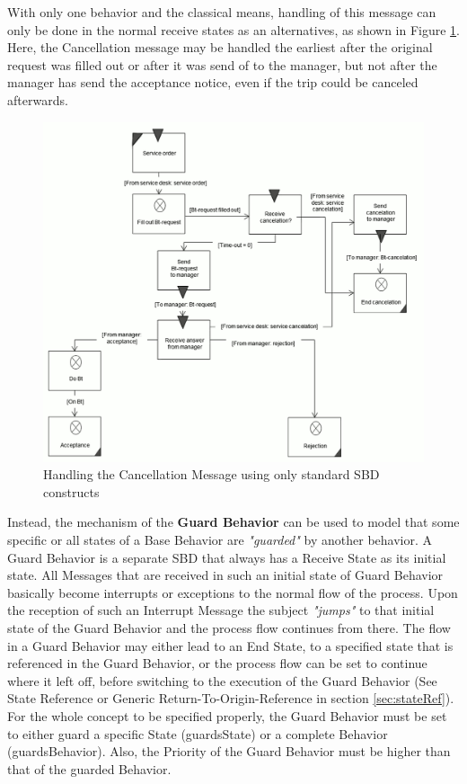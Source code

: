 With only one behavior and the classical means, handling of this message can only be done in the normal receive states as an alternatives, as shown in Figure \ref{fig:exceptionhandling}. Here, the Cancellation message may be handled the earliest after the original request was filled out or after it was send of to the manager, but not after the manager has send the acceptance notice, even if the trip could be canceled afterwards.


\begin{figure}[htbp]
	\centering
	\includegraphics[width=0.7\linewidth]{Figures/Ontology/SubjectBehavior/ExceptionHandling}
	\caption[Handling the Cancellation Message using only standard SBD constructs]{Handling the Cancellation Message using only standard SBD constructs}
	\label{fig:exceptionhandling}
\end{figure}

Instead, the mechanism of the \textbf{Guard Behavior} can be used to model that some specific or all states of a Base Behavior are \textit{"guarded"} by another behavior. A Guard Behavior is a separate SBD that always has a Receive State as its initial state. All Messages that are received in such an initial state of Guard Behavior basically become interrupts or exceptions to the normal flow of the process. Upon the reception of such an Interrupt Message the subject \textit{"jumps"} to that initial state of the Guard Behavior and the process flow continues from there. The flow in a Guard Behavior may either lead to an End State, to a specified state that is referenced in the Guard Behavior, or the process flow can be set to continue where it left off, before switching to the execution of the Guard Behavior (See State Reference or Generic Return-To-Origin-Reference in section \ref{sec:stateRef}). For the whole concept to be specified properly,  the Guard Behavior must be set to either guard a specific State (guardsState) or a complete Behavior (guardsBehavior). Also, the Priority of the Guard Behavior must be higher than that of the guarded Behavior. 

